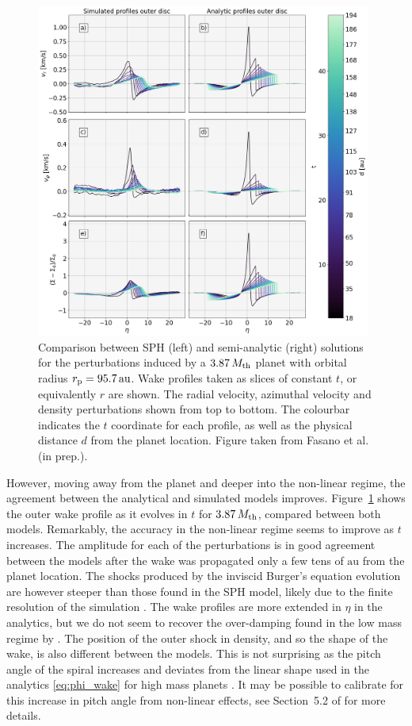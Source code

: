 \begin{figure}[H]
    \centering
    \includegraphics[width = 0.98\textwidth]{figures/comp_as_prof_out_high.png}
    \caption{Comparison between SPH (left) and semi-analytic (right) solutions for the perturbations induced by a $3.87 \, M_{\rm th}$ planet with orbital radius $r_{\rm p}=95.7 \, \mathrm{au}$. Wake profiles taken as slices of constant $t$, or equivalently $r$ are shown. The radial velocity, azimuthal velocity and density perturbations shown from top to bottom. The colourbar indicates the $t$ coordinate for each profile, as well as the physical distance $d$ from the planet location. Figure taken from Fasano et al. (in prep.).}
    \label{fig:profile_comparison}
\end{figure}

However, moving away from the planet and deeper into the non-linear regime, the agreement between the analytical and simulated models improves.
Figure~\ref{fig:profile_comparison} shows the outer wake profile as it evolves in $t$ for $3.87 \, M_{\rm th}$, compared between both models.
Remarkably, the accuracy in the non-linear regime seems to improve as $t$ increases.
The amplitude for each of the perturbations is in good agreement between the models after the wake was propagated only a few tens of $\mathrm{au}$ from the planet location.
The shocks produced by the inviscid Burger's equation evolution are however steeper than those found in the SPH model, likely due to the finite resolution of the simulation \citep{lodato2010}.
The wake profiles are more extended in $\eta$ in the analytics, but we do not seem to recover the over-damping found in the low mass regime by \citet{cimerman2021}.
The position of the outer shock in density, and so the shape of the wake, is also different between the models.
This is not surprising as the pitch angle of the spiral increases and deviates from the linear shape used in the analytics \eqref{eq:phi_wake} for high mass planets \cite{zhu2015}.
It may be possible to calibrate for this increase in pitch angle from non-linear effects, see Section~5.2 of \citet{cimerman2021} for more details.

